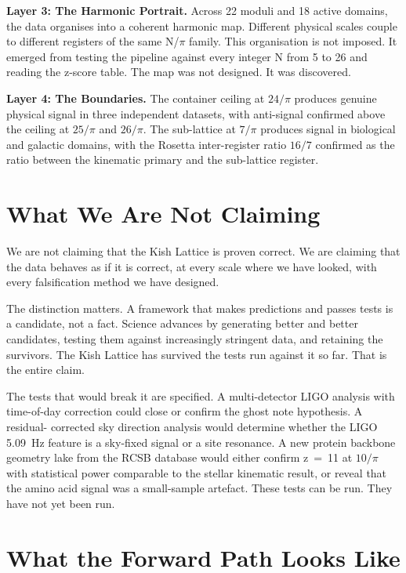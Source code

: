 \documentclass[11pt, letterpaper, openany]{book}
\begin{document}
\textbf{Layer 3: The Harmonic Portrait.}
Across 22 moduli and 18 active domains, the data organises into a coherent harmonic
map. Different physical scales couple to different registers of the same N/$\pi$
family. This organisation is not imposed. It emerged from testing the pipeline
against every integer N from 5 to 26 and reading the z-score table. The map was
not designed. It was discovered.

\textbf{Layer 4: The Boundaries.}
The container ceiling at $24/\pi$ produces genuine physical signal in three independent
datasets, with anti-signal confirmed above the ceiling at $25/\pi$ and $26/\pi$. The
sub-lattice at $7/\pi$ produces signal in biological and galactic domains, with the
Rosetta inter-register ratio $16/7$ confirmed as the ratio between the kinematic
primary and the sub-lattice register.

\section*{What We Are Not Claiming}

We are not claiming that the Kish Lattice is proven correct. We are claiming that the
data behaves as if it is correct, at every scale where we have looked, with every
falsification method we have designed.

The distinction matters. A framework that makes predictions and passes tests is a
candidate, not a fact. Science advances by generating better and better candidates,
testing them against increasingly stringent data, and retaining the survivors. The
Kish Lattice has survived the tests run against it so far. That is the entire claim.

The tests that would break it are specified. A multi-detector LIGO analysis with
time-of-day correction could close or confirm the ghost note hypothesis. A residual-
corrected sky direction analysis would determine whether the LIGO 5.09~Hz feature
is a sky-fixed signal or a site resonance. A new protein backbone geometry lake from
the RCSB database would either confirm z~=~11 at $10/\pi$ with statistical power
comparable to the stellar kinematic result, or reveal that the amino acid signal was
a small-sample artefact. These tests can be run. They have not yet been run.

\section*{What the Forward Path Looks Like}
\end{document}

